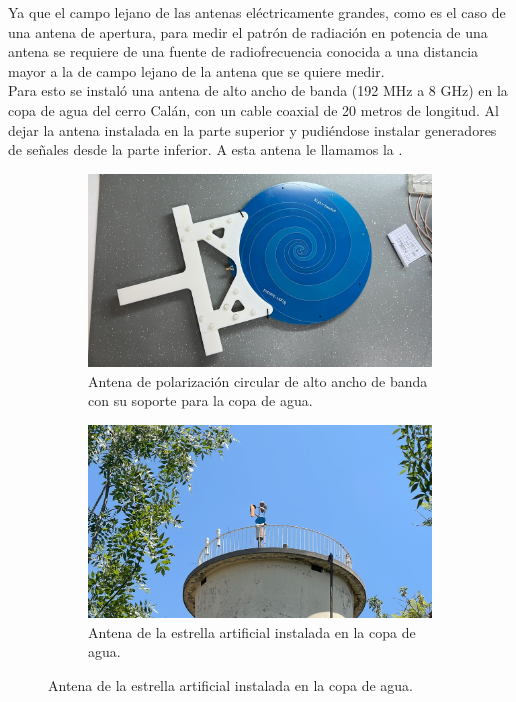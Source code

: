 Ya que el campo lejano de las antenas eléctricamente grandes, como es el caso de una antena de apertura, para medir el patrón de radiación en potencia de una antena se requiere de una fuente de radiofrecuencia conocida a una distancia mayor a la de campo lejano de la antena que se quiere medir.\\

Para esto se instaló una antena de alto ancho de banda (192 MHz a 8 GHz) en la copa de agua del cerro Calán, con un cable coaxial de 20 metros de longitud. Al dejar la antena instalada en la parte superior y pudiéndose instalar generadores de señales desde la parte inferior. A esta antena le llamamos la .\\

\begin{figure}[h!]
    \centering
    \begin{subfigure}{0.45\textwidth}
        \includegraphics[width=\textwidth]{img/paleta}
        \caption{Antena de polarización circular de alto ancho de banda con su soporte para la copa de agua.}
        \label{fig:antena_estrella}
    \end{subfigure}
    \begin{subfigure}{0.45\textwidth}
        \includegraphics[width=\textwidth]{img/fake_star}
        \caption{Antena de la estrella artificial instalada en la copa de agua.}
        \label{fig:antena_estrella2}
    \end{subfigure}
\end{figure}

